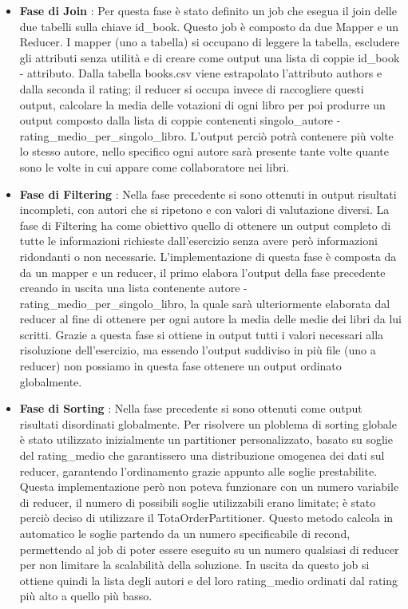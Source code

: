 \begin{itemize} %
    \item \textbf{ Fase di Join }: Per questa fase è stato definito un job che esegua il join delle due tabelli sulla chiave
    id\_book. Questo job è composto da due Mapper e un Reducer. I mapper (uno a tabella) si occupano di leggere la tabella, escludere
    gli attributi senza utilità e di creare come output una lista di coppie id\_book - attributo.
    Dalla tabella books.csv viene estrapolato l'attributo authors e dalla seconda il rating; il reducer si occupa invece
    di raccogliere questi output, calcolare la media delle votazioni di ogni libro per poi produrre un output composto dalla
    lista di coppie contenenti singolo\_autore - rating\_medio\_per\_singolo\_libro. L'output perciò potrà contenere più volte lo stesso
    autore, nello specifico ogni autore sarà presente tante volte quante sono le volte in cui appare come collaboratore nei libri.

    \item \textbf{Fase di Filtering } : Nella fase precedente si sono ottenuti in output risultati incompleti, con autori che si
    ripetono e con valori di valutazione diversi. La fase di Filtering ha come obiettivo quello di ottenere un output
    completo di tutte le informazioni richieste dall'esercizio senza avere però informazioni ridondanti o non necessarie.
    L'implementazione di questa fase è composta da da un mapper e un reducer, il primo elabora l'output della fase precedente creando
    in uscita una lista contenente autore - rating\_medio\_per\_singolo\_libro, la quale sarà ulteriormente elaborata dal reducer al fine di ottenere
    per ogni autore la media delle medie dei libri da lui scritti.
    Grazie a questa fase si ottiene in output tutti i valori necessari alla risoluzione dell'esercizio, ma essendo l'output suddiviso in più file
    (uno a reducer) non possiamo in questa fase ottenere un output ordinato globalmente.

    \item \textbf{Fase di Sorting} : Nella fase precedente si sono ottenuti come output risultati disordinati globalmente.
    Per risolvere un ploblema di sorting globale è stato utilizzato inizialmente un partitioner personalizzato, basato su soglie del rating\_medio
    che garantissero una distribuzione omogenea dei dati sul reducer, garantendo l'ordinamento grazie appunto alle soglie prestabilite.
    Questa implementazione però non poteva funzionare con un numero variabile di reducer, il numero di possibili soglie utilizzabili erano limitate;
    è stato perciò deciso di utilizzare il TotaOrderPartitioner.
    Questo metodo calcola in automatico le soglie partendo da un numero specificabile di recond, permettendo al job di poter essere eseguito su un numero qualsiasi
    di reducer per non limitare la scalabilità della soluzione.
    In uscita da questo job si ottiene quindi la lista degli autori e del loro rating\_medio ordinati dal rating più alto a quello più basso.
    \end{itemize}

